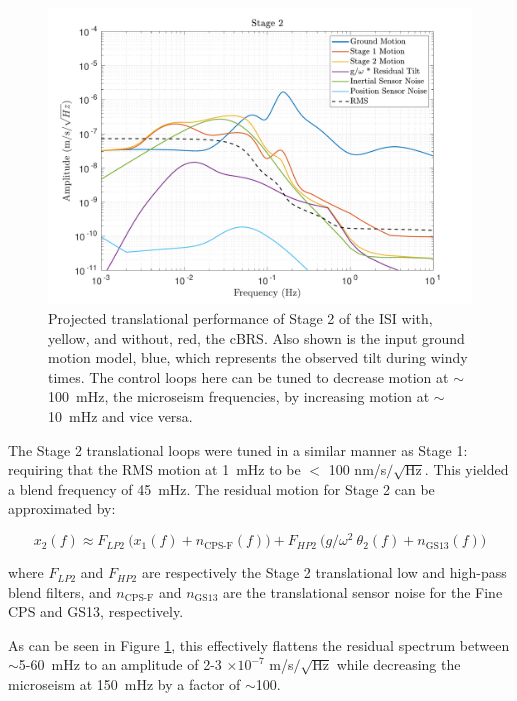 \documentclass [12pt, proquest]{uwthesis}[2019]
\begin{document}
\begin{figure}[!h]
\begin{center}
\includegraphics[width=\textwidth]{cBRS_Model_ST2X.pdf}
\caption[Projected translational performance of Stage 2 of the ISI] {Projected translational performance of Stage 2 of the ISI with, yellow, and without, red, the cBRS. Also shown is the input ground motion model, blue, which represents the observed tilt during windy times. The control loops here can be tuned to decrease motion at $\sim$100~mHz, the microseism frequencies, by increasing motion at $\sim$10~mHz and vice versa.}
\label{cBRS2X}
\end{center}
\end{figure}
The Stage 2 translational loops were tuned in a similar manner as Stage 1: requiring that the RMS motion at 1~mHz to be $<$ 100 nm/s$/\sqrt{\text{Hz}}$. This yielded  a blend frequency of 45~mHz. The residual motion for Stage 2 can be approximated by:

\begin{equation}
x_2(f)\approx F_{LP2}\ \big(x_1(f)+n_\text{CPS-F}(f)\big)+F_{HP2}\ \big( g/\omega^2\ \theta_2(f) +n_\text{GS13}(f) \big)
\end{equation}

where $F_{LP2}$ and $F_{HP2}$ are respectively the Stage 2 translational low and high-pass blend filters, and $n_\text{CPS-F}$ and $n_\text{GS13}$ are the translational sensor noise for the Fine CPS and GS13, respectively.

As can be seen in Figure \ref{cBRS2X}, this effectively flattens the residual spectrum between $\sim$5-60~mHz to an amplitude of 2-3 $\times 10^{-7}$ m/s$/\sqrt{\text{Hz}}$ while decreasing the microseism at 150~mHz by a factor of $\sim$100.
\end{document}
